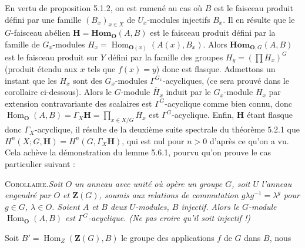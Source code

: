 En vertu de proposition 5.1.2, on est ramené au cas où $B$ est le faisceau
produit défini par une famille $(B_x)_{x\in X}$ de $U_x$-modules injectifs
$B_x$. Il en résulte que le $G$-faisceau abélien
$\mathbf H=\mathbf{Hom}_{\mathbf O}(A,B)$ est le faisceau produit défini par la famille
de $G_x$-modules
$H_x=\operatorname{Hom}_{{\mathbf O}(x)}(A(x),B_x)$.
Alors $\mathbf{Hom}_{{\mathbf O},G}(A,B)$ est le faisceau produit sur $Y$ défini par la
famille des groupes
$H_y=\left(\displaystyle\prod H_x\right)^G$ (produit étendu aux $x$ tels que $f(x)=y$) donc est flasque.
Admettons un instant que les $H_x$ sont des $G_x$-modules
$\Gamma^{G_x}$-acycliques, (ce sera prouvé dans le corollaire ci-dessous).
Alors le $G$-module $\overline H_x$ induit par le $G_x$-module $H_x$ par
extension contravariante des scalaires est $\Gamma^G$-acyclique comme bien
connu, donc
$\operatorname{Hom}_{\mathbf O}(A,B)=\Gamma_X\mathbf H
=\displaystyle\prod_{x\in X/G}\overline H_x
$ est $\Gamma^G$-acyclique. Enfin, $\mathbf H$ étant flasque donc $\Gamma_X$-acyclique, il résulte de la
deuxième suite spectrale du théorème 5.2.1 que
$H^n(X;G,\mathbf H)=H^n(G,\Gamma_X\mathbf H)$, qui est nul pour $n>0$ d'après ce qu'on a vu. Cela achève la
démonstration du lemme 5.6.1, pourvu qu'on prouve le cas particulier suivant :

\textsc{Corollaire.}\quad \textit{Soit $O$ un anneau avec unité où
opère un groupe $G$, soit $U$ l'anneau engendré par $O$ et $\mathbf Z(G)$,
soumis aux relations de commutation $g\lambda g^{-1}=\lambda^g$ pour $g\in G$,
$\lambda\in O$. Soient $A$ et $B$ deux $U$-modules, $B$ injectif. Alors le
$G$-module $\operatorname{Hom}_{\mathbf O}(A,B)$ est $\Gamma^G$-acyclique. (Ne pas croire
qu'il soit injectif !)}

Soit $B'=\operatorname{Hom}_{Z}(\mathbf Z(G),B)$ le groupe des
applications $f$ de $G$ dans $B$, nous

